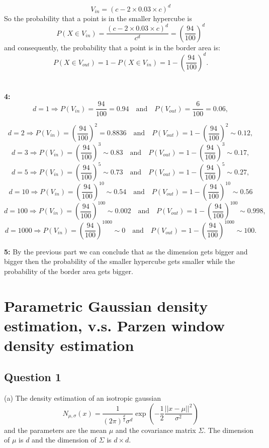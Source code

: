 \documentclass[12pt,english]{amsart}
\theoremstyle{definition}
\begin{document}
$$V_{in}=  \left(c- 2\times 0.03 \times c\right)^d$$
So the probability that a point is in the smaller hypercube is
$$P(X\in V_{in})= \frac{\left(c- 2\times 0.03 \times c\right)^d}{c^d} =\left( \frac{94}{100}\right)^d$$
and consequently, the probability that a point is in the border area is:
$$P(X\in V_{out})= 1- P(X\in V_{in})= 1-\left( \frac{94}{100}\right)^d .$$\\\\
\textbf{4:}
$$d= 1 \Rightarrow P(V_{in})= \frac{94}{100}= 0.94 \quad \text{and} \quad P(V_{out})= \frac{6}{100}=0.06,$$

$$d= 2 \Rightarrow P(V_{in})= \left(\frac{94}{100} \right)^2= 0.8836\quad \text{and} \quad P(V_{out})=1-\left(\frac{94}{100}\right)^2\sim 0.12,$$
$$d= 3 \Rightarrow P(V_{in})= \left(\frac{94}{100} \right)^3\sim 0.83\quad \text{and} \quad P(V_{out})= 1-\left(\frac{94}{100}\right)^3\sim 0.17,$$
$$d= 5 \Rightarrow P(V_{in})= \left(\frac{94}{100} \right)^5 \sim0.73\quad \text{and} \quad P(V_{out})=1-\left(\frac{94}{100}\right)^5\sim 0.27,$$
$$d= 10 \Rightarrow P(V_{in})= \left(\frac{94}{100}\right)^{10} \sim 0.54 \quad \text{and} \quad P(V_{out})= 1-\left(\frac{94}{100}\right)^{10}\sim 0.56$$
$$d= 100 \Rightarrow P(V_{in})= \left(\frac{94}{100}\right)^{100}  \sim 0.002\quad \text{and} \quad P(V_{out})=1-\left(\frac{94}{100}\right)^{100}\sim 0.998,$$
$$d= 1000\Rightarrow P(V_{in})= \left(\frac{94}{100} \right)^{1000} \sim 0\quad \text{and} \quad P(V_{out})= 1-\left(\frac{94}{100}\right)^{1000}\sim 100.$$

\textbf{5:} By the previous part we can conclude that as the dimension gets bigger and bigger then the probability of the smaller  hypercube gets smaller while the probability of the border area gets bigger. 

\section*{Parametric Gaussian density estimation, v.s. Parzen
window density estimation}

\subsection*{Question 1}
(a) The density estimation of an isotropic gaussian
$$
    N_{\mu, \sigma}(x)
    = \frac{1}{(2\pi)^\frac{d}{2}\sigma^d}
    \exp(-\frac{1}{2}\frac{||x-\mu||^2}{\sigma^2})
$$
and the parameters are the mean $\mu$ and the covariance matrix $\Sigma$. The dimension of $\mu$ is $d$ and the dimension of $\Sigma$ is $d\times d$.\\
\end{document}
